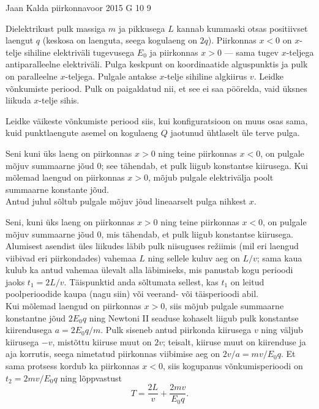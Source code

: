 {Jaan Kalda} %
{piirkonnavoor} %
{2015} %
{G 10} %
{9} %
{
\ifStatement
\osa Dielektrikust pulk massiga $m$ ja pikkusega $L$ kannab kummaski otsas positiivset laengut $q$ (keskosa on laenguta, seega kogulaeng on $2q$). Piirkonnas $x<0$ on $x$-telje sihiline elektriväli tugevusega $E_0$ ja piirkonnas $x>0$ --- sama tugev $x$-teljega antiparalleelne elektriväli. Pulga keskpunt on koordinaatide alguspunktis ja pulk on paralleelne $x$-teljega. Pulgale antakse $x$-telje sihiline algkiirus $v$. Leidke võnkumiste periood. Pulk on paigaldatud nii, et see ei saa pöörelda, vaid üksnes liikuda $x$-telje sihis.

\osa Leidke väikeste võnkumiste periood siis, kui konfiguratsioon on muus osas sama, kuid punktlaengute asemel on kogulaeng $Q$ jaotunud ühtlaselt üle terve pulga.
\fi


\ifHint
\osa Seni kuni üks laeng on piirkonnas $x>0$ ning teine piirkonnas $x<0$, on pulgale mõjuv summaarne jõud \num{0}; see tähendab, et pulk liigub konstantse kiirusega. Kui mõlemad laengud on piirkonnas $x>0$, mõjub pulgale elektrivälja poolt summaarne konstante jõud.\\
\osa Antud juhul sõltub pulgale mõjuv jõud lineaarselt pulga nihkest $x$.
\fi


\ifSolution
\osa Seni, kuni üks laeng on piirkonnas $x>0$ ning teine piirkonnas $x<0$, on pulgale mõjuv summaarne jõud \num{0}, mis tähendab, et pulk liigub konstantse kiirusega. \\
Alumisest asendist üles liikudes läbib pulk niisuguses re\v ziimis
(mil eri laengud viibivad eri piirkondades) vahemaa $L$ ning
sellele kuluv aeg on $L/v$; sama kaua kulub ka antud vahemaa ülevalt alla
läbimiseks, mis panustab kogu perioodi jaoks $t_1=2L/v$.
Täispunktid anda sõltumata sellest, kas $t_1$ on leitud poolperioodide kaupa (nagu siin) või veerand- või täisperioodi abil.\\
Kui mõlemad laengud on piirkonnas $x> 0$, siis mõjub pulgale summaarne konstantne jõud $2E_0q$
ning Newtoni II seaduse kohaselt liigub pulk konstantse kiirendusega
$a=2E_0q/m$. Pulk siseneb antud piirkonda kiirusega $v$ ning väljub kiirusega $-v$, mistõttu kiiruse muut on $2v$; teisalt,
kiiruse muut on kiirenduse ja aja korrutis, seega nimetatud piirkonnas viibimise
aeg on $2v/a=mv/E_0q$. Et sama protsess kordub ka piirkonnas $x<0$, siis
kogupanus võnkumisperioodi on $t_2=2mv/E_0q$ ning lõppvastust
\[ T=\frac{2L}v+\frac {2mv}{E_0q}. \]

}
